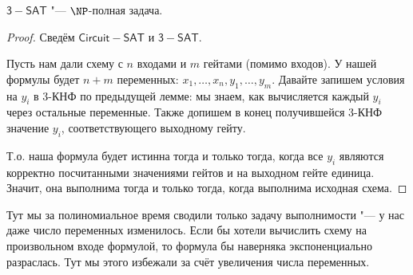 	\begin{theorem}
		$\mathsf{3-SAT}$ "--- $\NP$-полная задача.
	\end{theorem}
	\begin{proof}
		Сведём $\mathsf{Circuit-SAT}$ и $\mathsf{3-SAT}$.

		Пусть нам дали схему с $n$ входами и $m$ гейтами (помимо входов).
		У нашей формулы будет $n+m$ переменных: $x_1, \dots, x_n, y_1, \dots, y_m$.
		Давайте запишем условия на $y_i$ в 3-КНФ по предыдущей лемме: мы знаем, как вычисляется каждый $y_i$ через остальные переменные.
		Также допишем в конец получившейся 3-КНФ значение $y_i$, соответствующего выходному гейту.

		Т.о. наша формула будет истинна тогда и только тогда, когда все $y_i$ являются корректно посчитанными значениями гейтов и на выходном гейте единица.
		Значит, она выполнима тогда и только тогда, когда выполнима исходная схема.
	\end{proof}
	\begin{Rem}
		Тут мы за полиномиальное время сводили только задачу выполнимости "--- у нас даже число переменных изменилось.
		Если бы хотели вычислить схему на произвольном входе формулой, то формула бы наверняка экспоненциально разраслась.
		Тут мы этого избежали за счёт увеличения числа переменных.
	\end{Rem}
